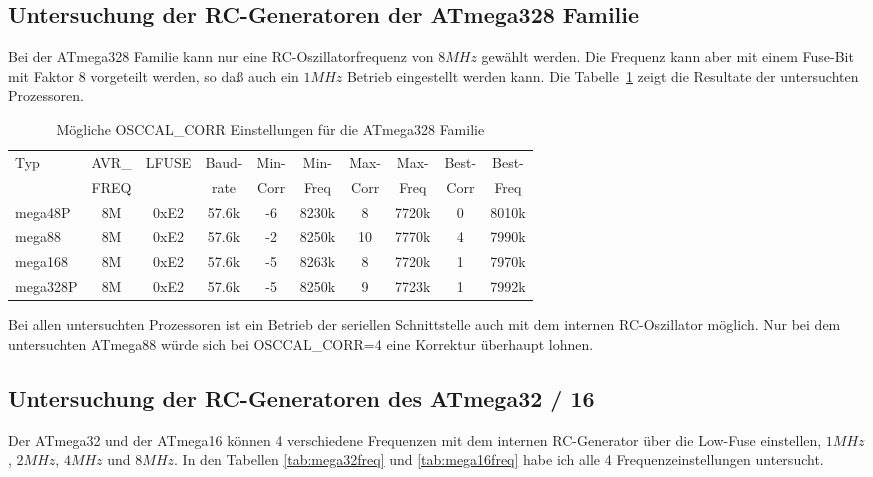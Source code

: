 \subsection{Untersuchung der RC-Generatoren der ATmega328 Familie}

Bei der ATmega328 Familie kann nur eine RC-Oszillatorfrequenz von \(8MHz\) gewählt werden. Die Frequenz kann
aber mit einem Fuse-Bit mit Faktor 8 vorgeteilt werden, so daß auch ein \(1MHz\) Betrieb eingestellt
werden kann. Die Tabelle~\ref{tab:mega328freq} zeigt die Resultate der untersuchten Prozessoren.

\begin{table}[H]
  \begin{center}
    \begin{tabular}{| l | c | c | c || c | c || c | c || c | c |}
    \hline
   Typ  &       AVR\_ & LFUSE & Baud- & Min- & Min- & Max- & Max- & Best- & Best-  \\
        &       FREQ  &       & rate & Corr & Freq & Corr & Freq  & Corr  & Freq  \\
    \hline
    \hline
mega48P &          8M & 0xE2  & 57.6k &  -6  & 8230k &  8  & 7720k  & 0  & 8010k \\
    \hline
mega88 &          8M & 0xE2  & 57.6k &  -2  & 8250k & 10  & 7770k  & 4  & 7990k \\
    \hline
mega168 &          8M & 0xE2  & 57.6k &  -5  & 8263k &  8  & 7720k  & 1  & 7970k \\
    \hline
mega328P &          8M & 0xE2  & 57.6k &  -5  & 8250k &  9  & 7723k  & 1  & 7992k \\
    \hline
    \end{tabular}
  \end{center}
  \caption{Mögliche OSCCAL\_CORR Einstellungen für die ATmega328 Familie}
  \label{tab:mega328freq}
\end{table}

Bei allen untersuchten Prozessoren ist ein Betrieb der seriellen Schnittstelle 
auch mit dem internen RC-Oszillator möglich. Nur bei dem untersuchten ATmega88 
würde sich bei OSCCAL\_CORR=4 eine Korrektur überhaupt lohnen.

\subsection{Untersuchung der RC-Generatoren des ATmega32 / 16}

Der ATmega32 und der ATmega16 können 4 verschiedene Frequenzen mit dem internen RC-Generator
über die Low-Fuse einstellen, \(1MHz\), \(2MHz\), \(4MHz\) und \(8MHz\).
In den Tabellen \ref{tab:mega32freq} und \ref{tab:mega16freq} habe ich alle 
4 Frequenzeinstellungen untersucht.

